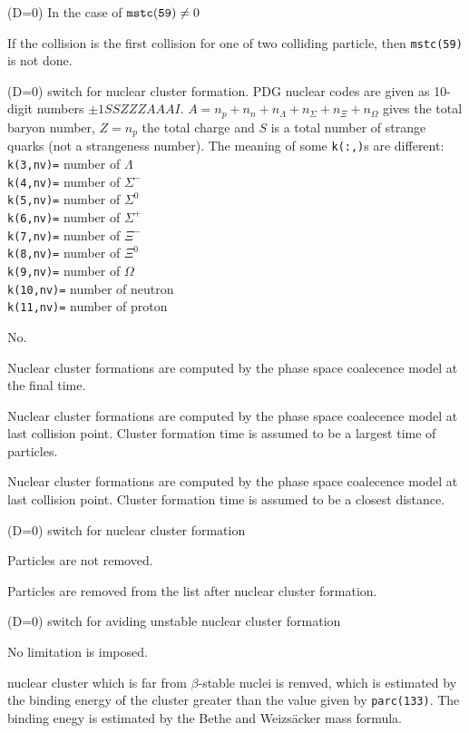 \documentclass[]{article}
\newenvironment{entry}%
{\begin{list}{}{\setlength{\topsep}{0mm} \setlength{\itemsep}{0mm}
\setlength{\parskip}{0mm} \setlength{\parsep}{0mm}
\setlength{\leftmargin}{20mm} \setlength{\rightmargin}{0mm}
\setlength{\labelwidth}{18mm} \setlength{\labelsep}{2mm}}}%
{\end{list}}
\newenvironment{subentry}%
{\begin{list}{}{\setlength{\topsep}{0mm} \setlength{\itemsep}{0mm}
\setlength{\parskip}{0mm} \setlength{\parsep}{0mm}
\setlength{\leftmargin}{10mm} \setlength{\rightmargin}{0mm}
\setlength{\labelwidth}{18mm} \setlength{\labelsep}{2mm}}}%
{\end{list}}
\newcommand{\ttt}[1]{{\tt#1}}
\newcommand{\itemt}[1]{\item[{\tt #1}\hfill]}
\begin{document}
\begin{entry}
\itemt{mstc(130) :}(D=0) In the case of ${\tt mstc(59)}\ne0$
 \begin{subentry}
    \itemt{$=1$ :} If the collision is the first collision for
            one of two colliding particle, then {\tt mstc(59)} is not
	    done.
 \end{subentry}

\itemt{mstc(131) :}(D=0) switch for nuclear cluster formation.
PDG nuclear codes are given as 10-digit numbers $\pm1SSZZZAAAI$.
$A = n_p + n_n + n_\Lambda + n_\Sigma + n_\Xi + n_\Omega$ gives the total baryon number,
$Z = n_p$ the total charge and
$S$ is a total number of strange quarks (not a strangeness number).
The meaning of some \ttt{k(:,)}s are different:\\
\ttt{k(3,nv)=} number of $\Lambda$\\
\ttt{k(4,nv)=} number of $\Sigma^-$\\
\ttt{k(5,nv)=} number of $\Sigma^0$\\
\ttt{k(6,nv)=} number of $\Sigma^+$\\
\ttt{k(7,nv)=} number of $\Xi^-$\\
\ttt{k(8,nv)=} number of $\Xi^0$\\
\ttt{k(9,nv)=} number of $\Omega$\\
\ttt{k(10,nv)=} number of neutron\\
\ttt{k(11,nv)=} number of proton

 \begin{subentry}
    \itemt{$=0$ :} No.
    \itemt{$=1$ :} Nuclear cluster formations are computed by the
    phase space coalecence model at the final time.
    \itemt{$=2$ :} Nuclear cluster formations are computed by the
    phase space coalecence model at last collision point.
    Cluster formation time is assumed to be a largest time of particles.
    \itemt{$=3$ :} Nuclear cluster formations are computed by the
    phase space coalecence model at last collision point.
    Cluster formation time is assumed to be a closest distance.
 \end{subentry}

\itemt{mstc(132) :}(D=0) switch for nuclear cluster formation
 \begin{subentry}
    \itemt{$=0$ :} Particles are not removed.
    \itemt{$=1$ :} Particles are removed from the list after nuclear cluster formation.
 \end{subentry}

\itemt{mstc(133) :}(D=0) switch for aviding unstable nuclear cluster formation
 \begin{subentry}
    \itemt{$=0$ :} No limitation is imposed.
    \itemt{$=1$ :} nuclear cluster which is far from $\beta$-stable nuclei is
    remved, which is estimated by the binding energy of the cluster greater
than the value given by \ttt{parc(133)}. The binding enegy is estimated by
the Bethe and Weizs\"acker mass formula.
 \end{subentry}


\end{entry}
\end{document}
